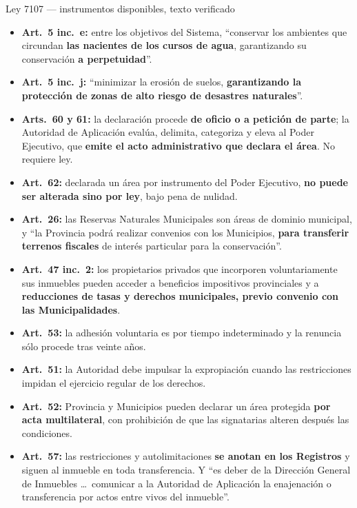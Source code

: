 \begin{ficha}{Ley 7107 --- instrumentos disponibles, texto verificado}
\begin{itemize}[leftmargin=*,nosep]
\item \textbf{Art.\ 5 inc.\ e:} entre los objetivos del Sistema, ``conservar los ambientes que circundan \textbf{las nacientes de los cursos de agua}, garantizando su conservación \textbf{a perpetuidad}''.
\item \textbf{Art.\ 5 inc.\ j:} ``minimizar la erosión de suelos, \textbf{garantizando la protección de zonas de alto riesgo de desastres naturales}''.
\item \textbf{Arts.\ 60 y 61:} la declaración procede \textbf{de oficio o a petición de parte}; la Autoridad de Aplicación evalúa, delimita, categoriza y eleva al Poder Ejecutivo, que \textbf{emite el acto administrativo que declara el área}. No requiere ley.
\item \textbf{Art.\ 62:} declarada un área por instrumento del Poder Ejecutivo, \textbf{no puede ser alterada sino por ley}, bajo pena de nulidad.
\item \textbf{Art.\ 26:} las Reservas Naturales Municipales son áreas de dominio municipal, y ``la Provincia podrá realizar convenios con los Municipios, \textbf{para transferir terrenos fiscales} de interés particular para la conservación''.
\item \textbf{Art.\ 47 inc.\ 2:} los propietarios privados que incorporen voluntariamente sus inmuebles pueden acceder a beneficios impositivos provinciales y a \textbf{reducciones de tasas y derechos municipales, previo convenio con las Municipalidades}.
\item \textbf{Art.\ 53:} la adhesión voluntaria es por tiempo indeterminado y la renuncia sólo procede tras veinte años.
\item \textbf{Art.\ 51:} la Autoridad debe impulsar la expropiación cuando las restricciones impidan el ejercicio regular de los derechos.
\item \textbf{Art.\ 52:} Provincia y Municipios pueden declarar un área protegida \textbf{por acta multilateral}, con prohibición de que las signatarias alteren después las condiciones.
\item \textbf{Art.\ 57:} las restricciones y autolimitaciones \textbf{se anotan en los Registros} y siguen al inmueble en toda transferencia. Y ``es deber de la Dirección General de Inmuebles \ldots\ comunicar a la Autoridad de Aplicación la enajenación o transferencia por actos entre vivos del inmueble''.
\end{itemize}
\end{ficha}

